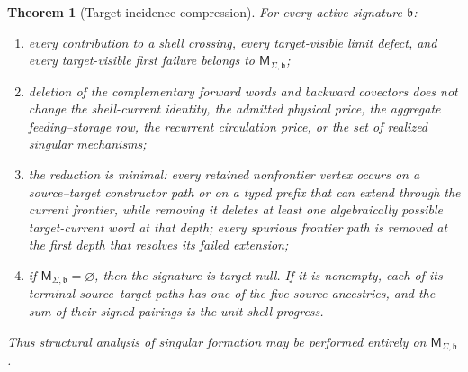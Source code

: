 \documentclass[11pt]{article}
\numberwithin{section}{part}
\theoremstyle{plain}
\newtheorem{theorem}{Theorem}[section]
\theoremstyle{definition}
\theoremstyle{remark}
\begin{document}
\begin{theorem}[Target-incidence compression]
\label{thm:target-incidence-compression}
For every active signature \(\mathfrak b\):
\begin{enumerate}[label=\textup{(M\arabic*)}]
\item every contribution to a shell crossing, every target-visible limit
defect, and every target-visible first failure belongs to
\(\mathsf M_{\Sigma,\mathfrak b}\);
\item deletion of the complementary forward words and backward covectors
does not change the shell-current identity, the admitted physical price, the
aggregate feeding--storage row, the recurrent circulation price, or the set
of realized singular mechanisms;
\item the reduction is minimal: every retained nonfrontier vertex occurs on a
source--target constructor path or on a typed prefix that can extend through
the current frontier, while removing it deletes at least one algebraically
possible target-current word at that depth; every spurious frontier path is
removed at the first depth that resolves its failed extension;
\item if \(\mathsf M_{\Sigma,\mathfrak b}=\varnothing\), then the signature
is target-null.  If it is nonempty, each of its terminal source--target paths
has one of the five source ancestries, and the sum of their signed pairings is
the unit shell progress.
\end{enumerate}
Thus structural analysis of singular formation may be performed entirely on
\(\mathsf M_{\Sigma,\mathfrak b}\).
\end{theorem}
\end{document}

